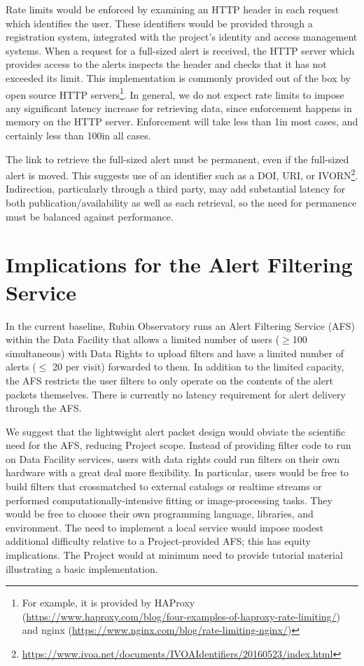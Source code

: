 \documentclass[DM,authoryear,toc]{lsstdoc}
\begin{document}
Rate limits would be enforced by examining an HTTP header in each request which identifies the user.
These identifiers would be provided through a registration system, integrated with the project's identity and access management systems.
When a request for a full-sized alert is received, the HTTP server which provides access to the alerts inspects the header and checks that it has not exceeded its limit.
This implementation is commonly provided out of the box by open source HTTP servers\footnote{For example, it is provided by HAProxy (\url{https://www.haproxy.com/blog/four-examples-of-haproxy-rate-limiting/}) and nginx (\url{https://www.nginx.com/blog/rate-limiting-nginx/})}.
In general, we do not expect rate limits to impose any significant latency increase for retrieving data, since enforcement happens in memory on the HTTP server.
Enforcement will take less than 1\msec in most cases, and certainly less than 100\msec in all cases.

The link to retrieve the full-sized alert must be permanent, even if the full-sized alert is moved.
This suggests use of an identifier such as a DOI, URI, or IVORN\footnote{\url{https://www.ivoa.net/documents/IVOAIdentifiers/20160523/index.html}}.
Indirection, particularly through a third party, may add substantial latency for both publication/availability as well as each retrieval, so the need for permanence must be balanced against performance.

\section{Implications for the Alert Filtering Service} \label{sec:alertfiltering}

In the current baseline, Rubin Observatory runs an Alert Filtering Service (AFS) within the Data Facility that allows a limited number of users ($\geq$100 simultaneous) with Data Rights to upload filters and have a limited number of alerts ($\leq$ 20 per visit) forwarded to them.
In addition to the limited capacity, the AFS restricts the user filters to only operate on the contents of the alert packets themselves.
There is currently no latency requirement for alert delivery through the AFS.

We suggest that the lightweight alert packet design would obviate the scientific need for the AFS, reducing Project scope.
Instead of providing filter code to run on Data Facility services, users with data rights could run filters on their own hardware with a great deal more flexibility.
In particular, users would be free to build filters that crossmatched to external catalogs or realtime streams or performed computationally-intensive fitting or image-processing tasks.
They would be free to choose their own programming language, libraries, and environment.
The need to implement a local service would impose modest additional difficulty relative to a Project-provided AFS; this has equity implications.
The Project would at minimum need to provide tutorial material illustrating a basic implementation.
\end{document}
